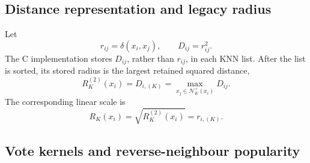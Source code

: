 \documentclass[pdflatex,sn-mathphys-num]{sn-jnl}
\newcommand{\calN}{\mathcal{N}}
\begin{document}
\subsection{Distance representation and legacy radius}

Let
\begin{equation}
r_{ij}=\delta(x_i,x_j),
\qquad
D_{ij}=r_{ij}^{2}.
\label{eq:linear_squared_distance}
\end{equation}
The C implementation stores $D_{ij}$, rather than $r_{ij}$, in each KNN list. After the list is sorted, its stored radius is the largest retained squared distance,
\begin{equation}
R_K^{(2)}(x_i)=D_{i,(K)}
=\max_{x_j\in\calN_K^+(x_i)}D_{ij}.
\label{eq:legacy_radius}
\end{equation}
The corresponding linear scale is
\begin{equation}
R_K(x_i)=\sqrt{R_K^{(2)}(x_i)}=r_{i,(K)}.
\label{eq:linear_knn_radius}
\end{equation}

\subsection{Vote kernels and reverse-neighbour popularity}
\end{document}
